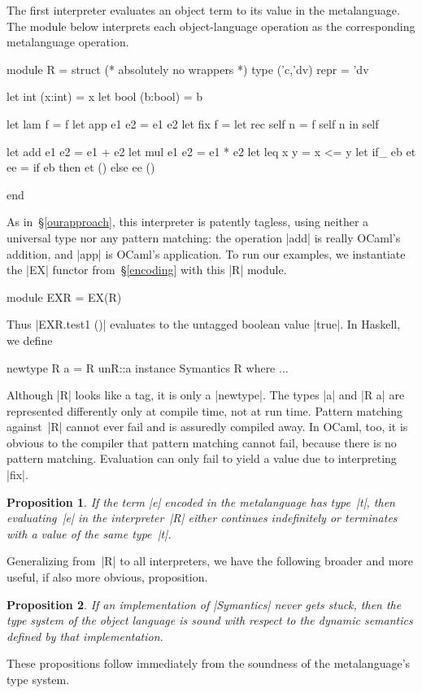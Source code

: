 \documentclass[preprint]{sigplanconf}
\newtheorem{prop}{Proposition}
\begin{document}
The first interpreter evaluates an object term to its value in the
metalanguage.  The module below interprets each object\hyp language
operation as the corresponding metalanguage operation.
\begin{code}
module R = struct
  (* absolutely no wrappers *)
  type ('c,'dv) repr = 'dv

  let int  (x:int)  = x
  let bool (b:bool) = b

  let lam  f        = f
  let app  e1 e2    = e1 e2
  let fix  f        =
    let rec self n = f self n in self

  let add  e1 e2    = e1 + e2
  let mul  e1 e2    = e1 * e2
  let leq  x y      = x <= y
  let if_  eb et ee = if eb then et () else ee ()

end
\end{code}

As in~\S\ref{ourapproach},
this interpreter is patently tagless, using neither a universal type nor
any pattern matching: the operation |add| is really
OCaml's addition, and |app| is OCaml's application. To run our
examples, we instantiate the |EX| functor from~\S\ref{encoding} with this |R|
module.
\begin{code}
module EXR = EX(R)
\end{code}
Thus |EXR.test1 ()| evaluates to the untagged boolean value |true|.
In Haskell, we define
\begin{code}
newtype R a = R {unR::a}
instance Symantics R where ...
\end{code}
Although |R| looks like a tag, it is only
a |newtype|.  The types |a| and |R a| are represented differently
only at compile time, not at run time.  Pattern matching against~|R|
cannot ever fail and is assuredly compiled away.
In OCaml, too, it is obvious to the compiler that
pattern matching cannot fail, because there is no
pattern matching. Evaluation can only fail to yield a value
due to interpreting |fix|.
\begin{prop}
If the term |e| encoded in the metalanguage has type~|t|,
then evaluating~|e| in the interpreter~|R| either continues
indefinitely or terminates with a value of the same type~|t|.
\end{prop}
Generalizing from~|R| to all interpreters, we have the following
broader and more useful, if also more obvious, proposition.
\begin{prop}
  If an implementation of |Symantics| never gets stuck, then
  the type system of the object
  language is sound with respect to the dynamic semantics defined by
  that implementation.
\end{prop}
These propositions follow immediately from the soundness of the
metalanguage's type system.
\end{document}
